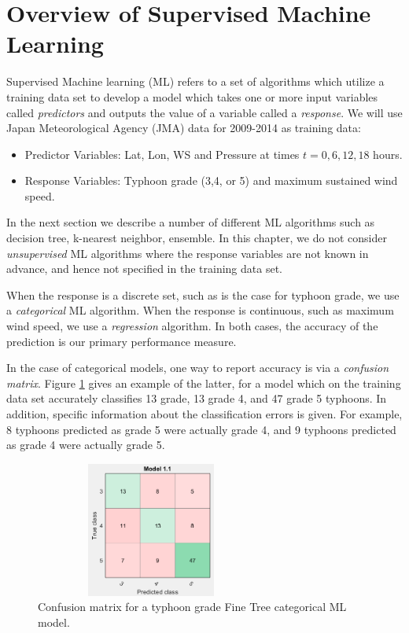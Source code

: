 \documentclass{SBCbookchapter}
\begin{document}
	\section{Overview of Supervised Machine Learning}
	
	Supervised Machine learning (ML) refers to a set of algorithms which utilize a training data set to develop a model which takes one or more input variables called \emph{predictors} and outputs the value of a variable called a \emph{response}. We will use Japan Meteorological Agency (JMA) data for 2009-2014 as training data:
	
	\begin{itemize}
		\item Predictor Variables: Lat, Lon, WS and Pressure at times $t=0,6,12,18$ hours.
		\item Response Variables: Typhoon grade (3,4, or 5) and maximum sustained wind speed.
	\end{itemize}
	
	{\flushleft In the} next section we describe a number of different ML algorithms such as decision tree, k-nearest neighbor, ensemble. In this chapter, we do not consider \emph{unsupervised} ML algorithms where the response variables are not known in advance, and hence not specified in the training data set.
	
	
	
	When the response is a discrete set, such as is the case for typhoon grade, we use a \emph{categorical} ML algorithm. When the response is continuous, such as maximum wind speed, we use a \emph{regression} algorithm.  In both cases, the accuracy of the prediction is our primary performance measure.  
	
	In the case of categorical models, one way to report accuracy is via a \emph{confusion matrix}. Figure \ref{FineTreeCategorical} gives an example of the latter, for a model which on the training data set accurately classifies 13 grade, 13 grade 4, and 47 grade 5 typhoons. In addition, specific information about the classification errors is given.  For example, 8 typhoons predicted as grade 5 were actually grade 4, and 9 typhoons predicted as grade 4 were actually grade 5. 
	
	\begin{figure}[!htpb]
		\centering
		\includegraphics[width=3in,height=1.75in]{TyphoonCM1.png}
		\caption{Confusion matrix for a typhoon grade Fine Tree categorical ML model.}
		\label{FineTreeCategorical}
	\end{figure}
	
\end{document}
